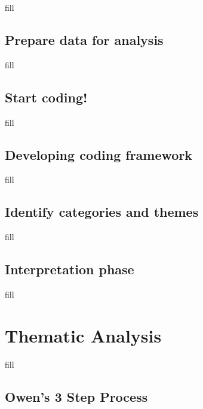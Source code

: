 \documentclass[
  b5paper]{book}
\begin{document}
fill

\hypertarget{prepare-data-for-analysis}{%
\subsection*{Prepare data for analysis}\label{prepare-data-for-analysis}}

fill

\hypertarget{start-coding}{%
\subsection*{Start coding!}\label{start-coding}}

fill

\hypertarget{developing-coding-framework}{%
\subsection*{Developing coding framework}\label{developing-coding-framework}}

fill

\hypertarget{identify-categories-and-themes}{%
\subsection*{Identify categories and themes}\label{identify-categories-and-themes}}

fill

\hypertarget{interpretation-phase}{%
\subsection*{Interpretation phase}\label{interpretation-phase}}

fill

\hypertarget{thematic-analysis}{%
\section{Thematic Analysis}\label{thematic-analysis}}

fill

\hypertarget{owens-3-step-process}{%
\subsection*{Owen's 3 Step Process}\label{owens-3-step-process}}
\end{document}

